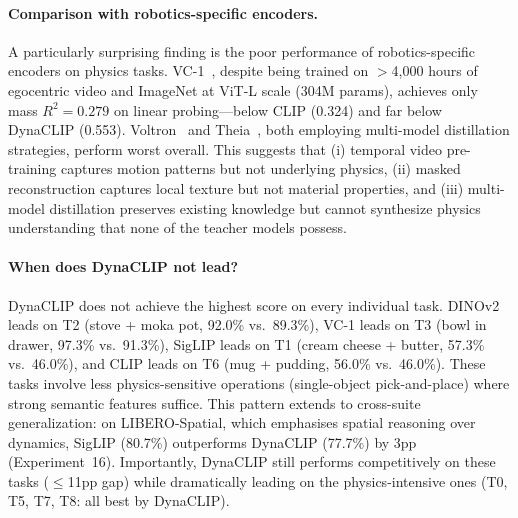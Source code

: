 \documentclass{article}
\newcommand{\methodname}{DynaCLIP}
\begin{document}
\paragraph{Comparison with robotics-specific encoders.}
A particularly surprising finding is the poor performance of robotics-specific encoders on physics tasks. VC-1~\cite{radosavovic2023vc1}, despite being trained on $>$4,000 hours of egocentric video and ImageNet at ViT-L scale (304M params), achieves only mass $R^2{=}0.279$ on linear probing---below CLIP (0.324) and far below \methodname{} (0.553). Voltron~\cite{karamcheti2023voltron} and Theia~\cite{shang2024theia}, both employing multi-model distillation strategies, perform worst overall. This suggests that (i) temporal video pre-training captures motion patterns but not underlying physics, (ii) masked reconstruction captures local texture but not material properties, and (iii) multi-model distillation preserves existing knowledge but cannot synthesize physics understanding that none of the teacher models possess.

\paragraph{When does DynaCLIP not lead?}
DynaCLIP does not achieve the highest score on every individual task. DINOv2 leads on T2 (stove + moka pot, 92.0\% vs.\ 89.3\%), VC-1 leads on T3 (bowl in drawer, 97.3\% vs.\ 91.3\%), SigLIP leads on T1 (cream cheese + butter, 57.3\% vs.\ 46.0\%), and CLIP leads on T6 (mug + pudding, 56.0\% vs.\ 46.0\%). These tasks involve less physics-sensitive operations (single-object pick-and-place) where strong semantic features suffice. This pattern extends to cross-suite generalization: on LIBERO-Spatial, which emphasises spatial reasoning over dynamics, SigLIP (80.7\%) outperforms \methodname{} (77.7\%) by 3pp (Experiment~16). Importantly, \methodname{} still performs competitively on these tasks ($\le$11pp gap) while dramatically leading on the physics-intensive ones (T0, T5, T7, T8: all best by \methodname{}).
\end{document}
